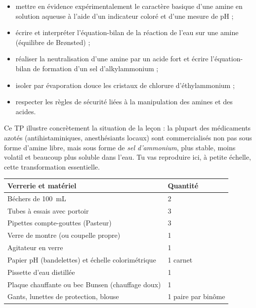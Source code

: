 \documentclass[11pt]{article}
\newcommand{\cle}[1]{{\popxbold\color{popdark}#1}}
\newcounter{popsec}
\newcounter{popsub}
\newcommand{\courssub}[1]{%
  \stepcounter{popsub}%
  \par\vspace{9pt}\noindent{\popxbold\fontsize{11.5}{13}\selectfont\color{popink}{\color{poporange}\thepopsec.\thepopsub}\hspace{6pt}#1}\par\nopagebreak\vspace{4pt}
}
\begin{document}
\begin{itemize}
\item mettre en évidence expérimentalement le \cle{caractère basique} d'une amine en solution aqueuse à l'aide d'un indicateur coloré et d'une mesure de pH ;
\item écrire et interpréter l'équation-bilan de la réaction de l'eau sur une amine (équilibre de Brønsted) ;
\item réaliser la \cle{neutralisation} d'une amine par un acide fort et écrire l'équation-bilan de formation d'un \cle{sel d'alkylammonium} ;
\item isoler par évaporation douce les cristaux de chlorure d'éthylammonium  ;
\item respecter les règles de sécurité liées à la manipulation des amines et des acides.
\end{itemize}

Ce TP illustre concrètement la situation de la leçon : la plupart des médicaments azotés (antihistaminiques, anesthésiants locaux) sont commercialisés non pas sous forme d'amine libre, mais sous forme de \emph{sel d'ammonium}, plus stable, moins volatil et beaucoup plus soluble dans l'eau. Tu vas reproduire ici, à petite échelle, cette transformation essentielle.

\courssub{Matériel et produits}

\begin{center}
\begin{tabularx}{\linewidth}{|l|X|}
\hline
\rowcolor{popblue!40} \textbf{Verrerie et matériel} & \textbf{Quantité} \\
\hline
Béchers de \SI{100}{mL} & 2 \\
\hline
Tubes à essais avec portoir & 3 \\
\hline
Pipettes compte-gouttes (Pasteur) & 3 \\
\hline
Verre de montre (ou coupelle propre) & 1 \\
\hline
Agitateur en verre & 1 \\
\hline
Papier pH (bandelettes) et échelle colorimétrique & 1 carnet \\
\hline
Pissette d'eau distillée & 1 \\
\hline
Plaque chauffante ou bec Bunsen (chauffage doux) & 1 \\
\hline
Gants, lunettes de protection, blouse & 1 paire par binôme \\
\hline
\end{tabularx}
\end{center}
\end{document}
